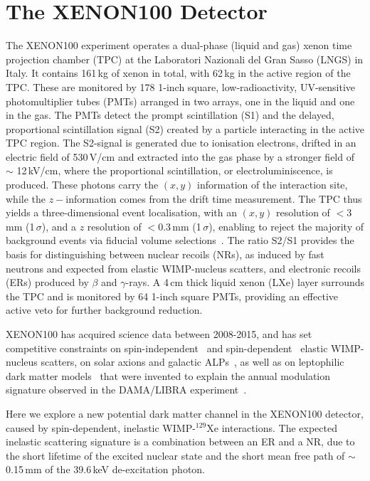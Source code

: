 \section{The XENON100 Detector}
\label{sec:xenon100}

The XENON100 experiment operates a dual-phase (liquid and gas) xenon time projection chamber (TPC) at the Laboratori Nazionali 
del Gran Sasso (LNGS) in Italy. It contains 161\,kg of xenon in total,  with  62\,kg in the active region of the TPC. These 
are monitored by 178 1-inch square, low-radioactivity, UV-sensitive photomultiplier tubes (PMTs) arranged in two arrays, one in the liquid 
and one in the gas. The PMTs detect the prompt scintillation (S1) and the delayed, proportional scintillation signal (S2) 
created by a particle interacting in the active TPC region. The S2-signal is generated due to ionisation electrons, drifted 
in an electric field of 530\,V/cm and extracted into the gas phase by a stronger field of $\sim$ 12\,kV/cm, where the proportional scintillation, or electroluminiscence, 
is produced. These photons carry the $(x,y)$ information of the interaction site, while the $z-$information comes from the drift time measurement. The TPC 
thus yields a three-dimensional event localisation, with an $(x,y)$ resolution of $<$3\,mm (1\,$\sigma$), and a $z$ resolution of  $<$0.3\,mm (1\,$\sigma$), enabling to reject the majority of background events via fiducial volume selections~\cite{Aprile:2011dd}. The ratio S2/S1 provides the basis for distinguishing between nuclear recoils (NRs), as induced by fast neutrons and expected from elastic WIMP-nucleus scatters, and electronic recoils (ERs) produced by $\beta$ and $\gamma$-rays.  A 4\,cm thick liquid xenon (LXe) layer surrounds the TPC and is monitored by 64 1-inch square PMTs, providing an effective active veto for further background reduction.

XENON100 has acquired science data between 2008-2015, and has set competitive constraints on spin-independent~\cite{Aprile:2012nq,Aprile:2016swn} 
and spin-dependent~\cite{Aprile:2013doa,Aprile:2016swn} elastic WIMP-nucleus 
scatters, on solar axions and galactic ALPs~\cite{Aprile:2014eoa}, as well as on leptophilic dark matter models~\cite{Aprile:2015ade,Aprile:2015ibr,Aprile:2017yea} 
that were invented to explain the annual modulation signature observed in the DAMA/LIBRA experiment~\cite{Bernabei:2012in}.

Here we explore a new potential dark matter channel in the XENON100 detector, caused by spin-dependent, inelastic WIMP-$^{129}$Xe interactions. The expected inelastic scattering signature is a combination between an ER and a NR, due to the short lifetime of the excited nuclear state and  the short mean free path of $\sim$0.15\,mm of the 39.6\,keV de-excitation photon. 


